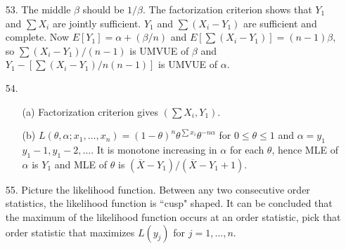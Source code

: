\begin{enumerate}
    \item[53.] The middle $\beta$ should be $1/\beta$. The factorization criterion shows that $Y_1$ and $\sum X_i$ are jointly sufficient.  $Y_1$ and $\sum (X_i-Y_1)$ are sufficient and complete. Now $E[Y_1] = \alpha + (\beta/n)$ and $E[\sum(X_i-Y_1)] = (n-1)\beta$, so $\sum(X_i-Y_1)/(n-1)$ is UMVUE of $\beta$ and $Y_1 - [\sum(X_i-Y_1)/n(n-1)]$ is UMVUE of $\alpha$.
	
  	\item[54.] \begin{enumerate}
  		\item[(a)] Factorization criterion gives $(\sum X_i, Y_1)$.
  		\item[(b)] $L(\theta, \alpha; x_1,\ldots,x_n) = (1-\theta)^n\theta^{\sum x_i}\theta^{-n\alpha}$ for $0\le \theta\le 1$ and $\alpha = y_1$ \\
  		$y_1-1, y_1-2,\ldots$. It is monotone increasing in $\alpha$ for each $\theta$, hence MLE of $\alpha$ is $Y_1$ and MLE of $\theta$ is $(\overline{X}-Y_1)/(\overline{X}-Y_1+1)$.
  	\end{enumerate}	

  	\item[55.] Picture the likelihood function. Between any two consecutive order statistics, the likelihood function is ``cusp" shaped. It can be concluded that the maximum of the likelihood function occurs at an order statistic, pick that order statistic that maximizes $L(y_j)$ for $j=1,\dots,n$.	
\end{enumerate}